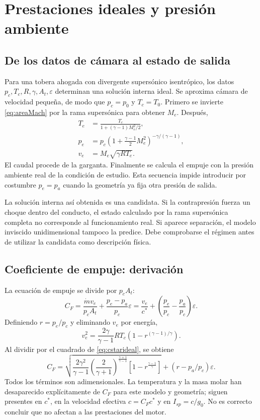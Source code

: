 \chapter{Prestaciones ideales y presión ambiente}\label{ch:07}
\section{De los datos de cámara al estado de salida}
Para una tobera ahogada con divergente supersónico isentrópico, los datos $p_c,T_c,R,\gamma,A_t,\varepsilon$ determinan una solución interna ideal. Se aproxima cámara de velocidad pequeña, de modo que $p_c=p_0$ y $T_c=T_0$. Primero se invierte \eqref{eq:areaMach} por la rama supersónica para obtener $M_e$. Después,
\begin{align}
 T_e&=\frac{T_c}{1+(\gamma-1)M_e^2/2},\\
 p_e&=p_c\left(1+\frac{\gamma-1}{2}M_e^2\right)^{-\gamma/(\gamma-1)},\\
 v_e&=M_e\sqrt{\gamma RT_e}.
\end{align}
El caudal procede de la garganta. Finalmente se calcula el empuje con la presión ambiente real de la condición de estudio. Esta secuencia impide introducir por costumbre $p_e=p_a$ cuando la geometría ya fija otra presión de salida.

La solución interna así obtenida es una candidata. Si la contrapresión fuerza un choque dentro del conducto, el estado calculado por la rama supersónica completa no corresponde al funcionamiento real. Si aparece separación, el modelo inviscido unidimensional tampoco la predice. Debe comprobarse el régimen antes de utilizar la candidata como descripción física.\cite{MIT03}
\section{Coeficiente de empuje: derivación}
La ecuación de empuje se divide por $p_cA_t$:
\[
 C_F=\frac{\dot m v_e}{p_cA_t}+\frac{p_e-p_a}{p_c}\varepsilon
 =\frac{v_e}{c^*}+\left(\frac{p_e}{p_c}-\frac{p_a}{p_c}\right)\varepsilon.
\]
Definiendo $r=p_e/p_c$ y eliminando $v_e$ por energía,
\[
 v_e^2=\frac{2\gamma}{\gamma-1}RT_c\left(1-r^{(\gamma-1)/\gamma}\right).
\]
Al dividir por el cuadrado de \eqref{eq:cstarideal}, se obtiene
\begin{equation}\label{eq:CF}
 C_F=\sqrt{\frac{2\gamma^2}{\gamma-1}
 \left(\frac{2}{\gamma+1}\right)^{\frac{\gamma+1}{\gamma-1}}
 \left[1-r^{\frac{\gamma-1}{\gamma}}\right]}
 +(r-p_a/p_c)\varepsilon.
\end{equation}
Todos los términos son adimensionales. La temperatura y la masa molar han desaparecido explícitamente de $C_F$ para este modelo y geometría; siguen presentes en $c^*$, en la velocidad efectiva $c=C_Fc^*$ y en $I_{sp}=c/g_0$. No es correcto concluir que no afectan a las prestaciones del motor.

